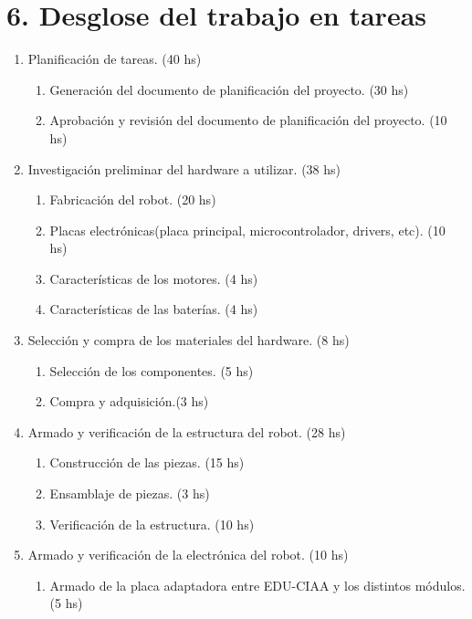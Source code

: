 \documentclass[11pt]{charter}
\begin{document}

\section{6. Desglose del trabajo en tareas}
\label{sec:wbs}
\begin{enumerate}
\item Planificación de tareas. (40 hs)
	\begin{enumerate}
	\item Generación del documento de planificación del proyecto. (30 hs)
	\item Aprobación y revisión del documento de planificación del proyecto. (10 hs)
	\end{enumerate}
\item Investigación preliminar del hardware a utilizar. (38 hs)
	\begin{enumerate}
	\item Fabricación del robot. (20 hs)
	\item Placas electrónicas(placa principal, microcontrolador, drivers, etc). (10 hs)
	\item Características de los motores.  (4 hs)
	\item Características de las baterías. (4 hs)
	\end{enumerate}
\item Selección y compra de los materiales del hardware. (8 hs)
	\begin{enumerate}
	\item Selección de los componentes. (5 hs)
	\item Compra y adquisición.(3 hs)
	\end{enumerate}
\item Armado y verificación de la estructura del robot. (28 hs)
	\begin{enumerate}
	\item Construcción de las piezas. (15 hs)
	\item Ensamblaje de piezas. (3 hs)
	\item Verificación de la estructura. (10 hs)
	\end{enumerate}
\item Armado y verificación de la electrónica del robot. (10 hs)
	\begin{enumerate}
	\item Armado de la placa adaptadora entre EDU-CIAA y los distintos módulos. (5 hs)

\end{enumerate}
\end{enumerate}
\end{document}
